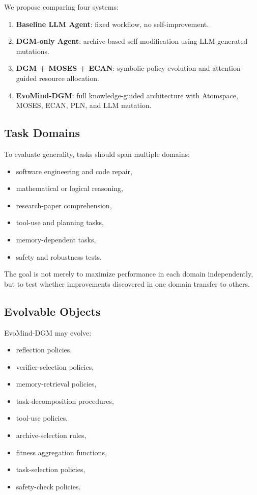 \documentclass[11pt]{article}
\begin{document}
We propose comparing four systems:

\begin{enumerate}[leftmargin=*]
    \item \textbf{Baseline LLM Agent}: fixed workflow, no self-improvement.
    \item \textbf{DGM-only Agent}: archive-based self-modification using LLM-generated mutations.
    \item \textbf{DGM + MOSES + ECAN}: symbolic policy evolution and attention-guided resource allocation.
    \item \textbf{EvoMind-DGM}: full knowledge-guided architecture with Atomspace, MOSES, ECAN, PLN, and LLM mutation.
\end{enumerate}

\subsection{Task Domains}

To evaluate generality, tasks should span multiple domains:

\begin{itemize}[leftmargin=*]
    \item software engineering and code repair,
    \item mathematical or logical reasoning,
    \item research-paper comprehension,
    \item tool-use and planning tasks,
    \item memory-dependent tasks,
    \item safety and robustness tests.
\end{itemize}

The goal is not merely to maximize performance in each domain independently, but to test whether improvements discovered in one domain transfer to others.

\subsection{Evolvable Objects}

EvoMind-DGM may evolve:

\begin{itemize}[leftmargin=*]
    \item reflection policies,
    \item verifier-selection policies,
    \item memory-retrieval policies,
    \item task-decomposition procedures,
    \item tool-use policies,
    \item archive-selection rules,
    \item fitness aggregation functions,
    \item task-selection policies,
    \item safety-check policies.
\end{itemize}
\end{document}
